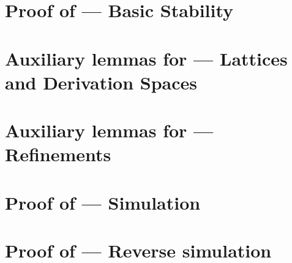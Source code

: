 \section{Proof of  --- Basic Stability}
\label{basic_stability_proof}


\section{Auxiliary lemmas for  --- Lattices and Derivation Spaces}
\label{lemmas_lattices_and_derivation_spaces_proof}


\section{Auxiliary lemmas for  --- Refinements}
\label{refinements_proof}


\section{Proof of  --- Simulation}
\label{simulation_proof}


\section{Proof of  --- Reverse simulation}
\label{reverse_simulation_proof}



